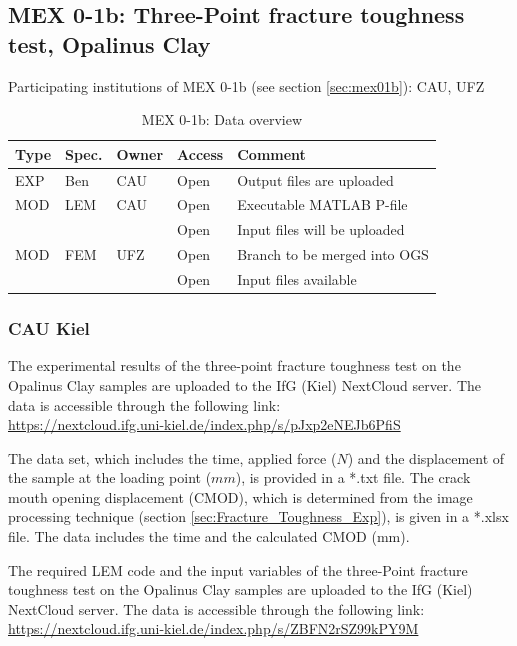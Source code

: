 \subsection{MEX 0-1b: Three-Point fracture toughness test, Opalinus Clay}

Participating institutions of MEX 0-1b (see section \ref{sec:mex01b}): CAU, UFZ

\begin{table}[ht!]
\caption{MEX 0-1b: Data overview}
\label{tab:dms-mex01b-overview}
\small
\begin{tabular}{l|l|l|l|L{4.7cm}}
\hline
{}
Type & Spec. & Owner & Access     & Comment                       \\ 
\hline
EXP  &   Ben    & CAU   & Open    & Output files are uploaded     \\
\hline \hline
MOD  & LEM   & CAU   & Open       & Executable MATLAB P-file      \\
     &       &       & Open       & Input files will be uploaded  \\
\hline
MOD  & FEM   & UFZ   & Open       & Branch to be merged into OGS  \\
     &       &       & Open       & Input files available         \\
%
\hline
\end{tabular}
\end{table}
\normalsize

\subsubsection*{CAU Kiel}

The experimental results of the three-point fracture toughness test on the Opalinus Clay samples are uploaded to the IfG (Kiel) NextCloud server. The data is accessible through the following link:\\
\url{https://nextcloud.ifg.uni-kiel.de/index.php/s/pJxp2eNEJb6PfiS}

The data set, which includes the time, applied force ($N$) and the displacement of the sample at the loading point ($mm$), is provided in a *.txt file. The crack mouth opening displacement (CMOD), which is determined from the image processing technique (section \ref {sec:Fracture_Toughness_Exp}), is given in a *.xlsx file. The data includes the time and the calculated CMOD (mm). 

The required LEM code and the input variables of the three-Point fracture toughness test on the Opalinus Clay samples are uploaded to the IfG (Kiel) NextCloud server. The data is accessible through the following link:\\
\url{https://nextcloud.ifg.uni-kiel.de/index.php/s/ZBFN2rSZ99kPY9M}

